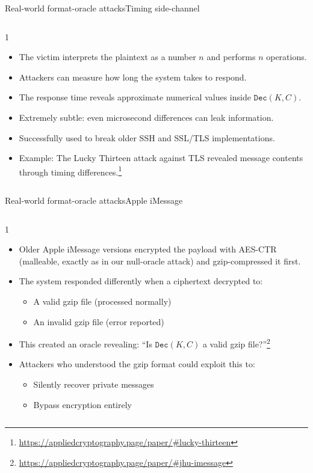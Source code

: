 \ifdefined\PRESENTATION\else\PassOptionsToClass{handout}{beamer}\fi\documentclass[aspectratio=169, lualatex]{beamer}
\begin{document}
\begin{frame}{Real-world format-oracle attacks}{Timing side-channel}
	\begin{columns}[c]
		\begin{column}{1\textwidth}
			\begin{itemize}[<+->]
				\item The victim interprets the plaintext as a number $n$ and performs $n$ operations.
				\item Attackers can measure how long the system takes to respond.
				\item The response time reveals approximate numerical values inside $\texttt{Dec}(K, C)$.
				\item Extremely subtle: even microsecond differences can leak information.
				\item Successfully used to break older SSH and SSL/TLS implementations.
				\item Example: The Lucky Thirteen attack against TLS revealed message contents through timing differences.\footnote{\url{https://appliedcryptography.page/paper/\#lucky-thirteen}}
			\end{itemize}
		\end{column}
	\end{columns}
\end{frame}

\begin{frame}{Real-world format-oracle attacks}{Apple iMessage}
	\begin{columns}[c]
		\begin{column}{1\textwidth}
			\begin{itemize}[<+->]
				\item Older Apple iMessage versions encrypted the payload with AES-CTR (malleable, exactly as in our null-oracle attack) and gzip-compressed it first.
				\item The system responded differently when a ciphertext decrypted to:
				      \begin{itemize}
					      \item A valid gzip file (processed normally)
					      \item An invalid gzip file (error reported)
				      \end{itemize}
				\item This created an oracle revealing: ``Is $\texttt{Dec}(K, C)$ a valid gzip file?''\footnote{\url{https://appliedcryptography.page/paper/\#jhu-imessage}}
				\item Attackers who understood the gzip format could exploit this to:
				      \begin{itemize}
					      \item Silently recover private messages
					      \item Bypass encryption entirely
				      \end{itemize}
			\end{itemize}
		\end{column}
	\end{columns}
\end{frame}
\end{document}
